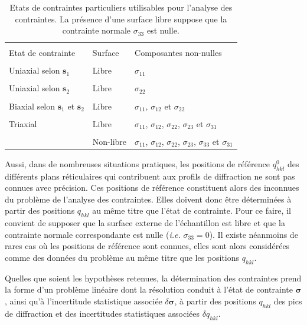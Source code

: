 \documentclass[french,a4paper]{report}
\begin{document}
\begin{table}
\centering
\begin{tabular}{lll}
\hline
\hline
\\[-1em]
Etat de contrainte & Surface & Composantes non-nulles\\
\hline
\\[-1em]
Uniaxial selon $\boldsymbol s_1$ & Libre & $\sigma_{11}$ \\
\hline
\\[-1em]
Uniaxial selon $\boldsymbol s_2$ & Libre & $\sigma_{22}$ \\
\hline
\\[-1em]
Biaxial selon $\boldsymbol s_1$ et $\boldsymbol s_2$ & Libre & $\sigma_{11}$, $\sigma_{12}$ et $\sigma_{22}$ \\
\hline
\\[-1em]
Triaxial & Libre & $\sigma_{11}$, $\sigma_{12}$, $\sigma_{22}$, $\sigma_{23}$ et $\sigma_{31}$\\
\\[-1em]
 & Non-libre & $\sigma_{11}$, $\sigma_{12}$, $\sigma_{22}$, $\sigma_{23}$, $\sigma_{33}$ et $\sigma_{31}$\\
\hline
\hline
\end{tabular}
\caption{Etats de contraintes particuliers utilisables pour l'analyse des contraintes. La présence d'une surface libre suppose que la contrainte normale $\sigma_{33}$ est nulle.}
\label{tab_contrainte}
\end{table}

Aussi, dans de nombreuses situations pratiques, les positions de référence $q^0_{hkl}$ des différents plans réticulaires qui contribuent aux profils de diffraction ne sont pas connues avec précision. Ces positions de référence constituent alors des inconnues du problème de l'analyse des contraintes. Elles doivent donc être déterminées à partir des positions $q_{hkl}$ au même titre que l'état de contrainte. Pour ce faire, il convient de supposer que la surface externe de l'échantillon est libre et que la contrainte normale correspondante est nulle (\textit{i.e.} $\sigma_{33}=0$). Il existe néanmoins de rares cas où les positions de référence sont connues, elles sont alors considérées comme des données du problème au même titre que les positions $q_{hkl}$.

Quelles que soient les hypothèses retenues, la détermination des contraintes prend la forme d'un problème linéaire dont la résolution conduit à l'état de contrainte $\boldsymbol \sigma$, ainsi qu'à l'incertitude statistique associée $\delta \boldsymbol \sigma$, à partir des positions $q_{hkl}$ des pics de diffraction et des incertitudes statistiques associées $\delta q_{hkl}$.
\end{document}
